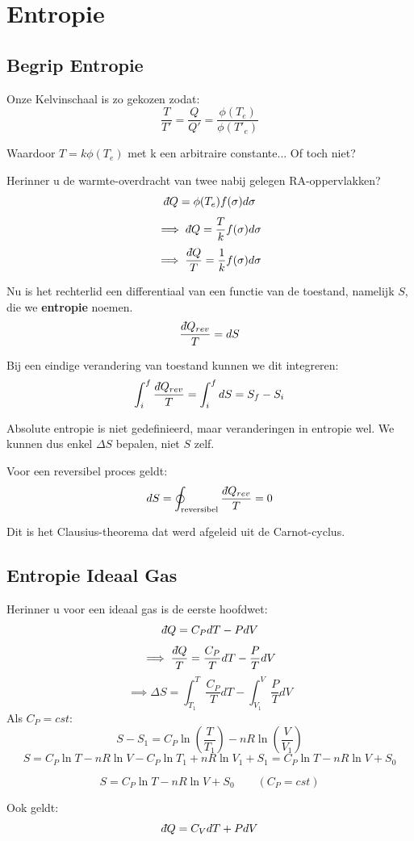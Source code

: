\section{Entropie}

\subsection{Begrip Entropie}

Onze Kelvinschaal is zo gekozen zodat:
\[
\frac{T}{T'} = \frac{Q}{Q'} = \frac{\phi(T_e)}{\phi(T'_e)}
\]

Waardoor \(T = k \phi (T_e)\) met k een arbitraire constante... Of toch niet? 

Herinner u de warmte-overdracht van twee nabij gelegen RA-oppervlakken?
\[
\dbar Q = \phi (T_e) f(\sigma) d\sigma
\]
\[
\implies \dbar Q = \frac{T}{k} f(\sigma) d\sigma 
\]
\[\implies \frac{\dbar Q}{T} = \frac{1}{k} f(\sigma) d\sigma \]

Nu is het rechterlid een differentiaal van een functie van de toestand, namelijk \(S\), die we \textbf{entropie} noemen.
\[ \frac{\dbar Q_{rev}}{T} = dS\]

Bij een eindige verandering van toestand kunnen we dit integreren:
\[\int_{i}^{f} \frac{\dbar Q_{rev}}{T} = \int_{i}^{f} dS = S_f - S_i\]

Absolute entropie is niet gedefinieerd, maar veranderingen in entropie wel. We kunnen dus enkel \(\Delta S\) bepalen, niet \(S\) zelf.

Voor een reversibel proces geldt:
\[d S = \oint_{\text{reversibel}}
 \frac{\dbar Q_{rev}}{T} = 0\]

 Dit is het Clausius-theorema dat werd afgeleid uit de Carnot-cyclus.

\subsection{Entropie Ideaal Gas}

Herinner u voor een ideaal gas is de eerste hoofdwet:
\[\dbar Q = C_P dT - P dV\]
\[\implies \frac{\dbar Q}{T} = \frac{C_P}{T} dT - \frac{P}{T} dV\]
\[\implies \Delta S = \int_{T_1}^{T} \frac{C_P}{T} dT - \int_{V_1}^{V} \frac{P}{T} dV\]
Als \(C_P = cst\):
\[ S-S_1 = C_P \ln \left(\frac{T}{T_1}\right) - nR \ln \left(\frac{V}{V_1}\right)\]
\[S = C_P \ln T-nR \ln V -C_P \ln T_1 + nR\ln V_1 + S_1 = C_P\ln T-nR\ln V +S_0 \]

\[\boxed{S = C_P\ln T-nR\ln V + S_0} \qquad (C_P = cst)\]


Ook geldt:
\[\dbar Q = C_V dT + P dV\]

